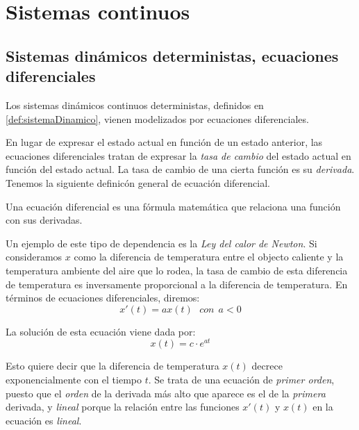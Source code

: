 \section{Sistemas continuos}

\subsection{Sistemas dinámicos deterministas, ecuaciones diferenciales}

Los sistemas dinámicos continuos deterministas, definidos en \ref{def:sistemaDinamico}, vienen modelizados por ecuaciones diferenciales.

En lugar de expresar el estado actual en función de un estado anterior, las ecuaciones diferenciales tratan de expresar la \emph{tasa de cambio} del estado actual en función del estado actual. La tasa de cambio de una cierta función es su \emph{derivada}. Tenemos la siguiente definicón general de ecuación diferencial.

\begin{definition}
Una ecuación diferencial es una fórmula matemática que relaciona una función con sus derivadas.
\end{definition}

\begin{example}\label{ex:calor}
Un ejemplo de este tipo de dependencia es la \emph{Ley del calor de Newton}. Si consideramos $x$ como la diferencia de temperatura entre el objecto caliente y la temperatura ambiente del aire que lo rodea, la tasa de cambio de esta diferencia de temperatura es inversamente proporcional a la diferencia de temperatura. En términos de ecuaciones diferenciales, diremos:
\begin{equation}
x'(t) = ax(t)~~~con~~ a<0
\end{equation}

La solución de esta ecuación viene dada por:
\begin{equation}
x(t) = c\cdot e^{at}
\end{equation}

Esto quiere decir que la diferencia de temperatura $x(t)$ decrece exponencialmente con el tiempo $t$. Se trata de una ecuación  de \emph{primer orden}, puesto que el \emph{orden} de la derivada más alto que aparece es el de la \emph{primera} derivada, y \emph{lineal} porque la relación entre las funciones $x'(t)$ y $x(t)$ en la ecuación es \emph{lineal}.
\end{example}

